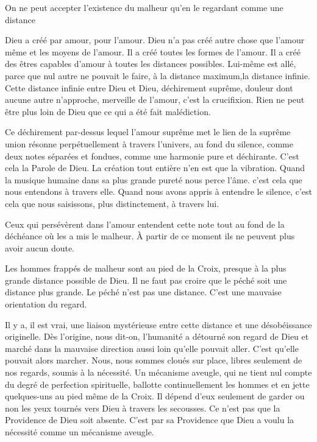 \documentclass[french,twoside]{book} %
\begin{document}
On ne peut accepter l'existence du malheur qu'en le regardant comme une distance\par
Dieu a créé par amour, pour l'amour. Dieu n'a pas créé autre chose que l'amour même et les moyens de l'amour. Il a créé toutes les formes de l'amour. Il a créé des êtres capables d'amour à toutes les distances possibles. Lui-même est allé, parce que nul autre ne pouvait le faire, à la distance maximum,la distance infinie. Cette distance infinie entre Dieu et Dieu, déchirement suprême, douleur dont aucune autre n'approche, merveille de l'amour, c'est la crucifixion. Rien ne peut être plus loin de Dieu que ce qui a été fait malédiction.\par
Ce déchirement par-dessus lequel l'amour suprême met le lien de la suprême union résonne perpétuellement à travers l'univers, au fond du silence, comme deux notes séparées et fondues, comme une harmonie pure et déchirante. C'est cela la Parole de Dieu. La création tout entière n'en est que la vibration. Quand la musique humaine dans sa plus grande pureté nous perce l'âme. c'est cela que nous entendons à travers elle. Quand nous avons appris à entendre le silence, c'est cela que nous saisissons, plus distinctement, à travers lui.\par
Ceux qui persévèrent dans l'amour entendent cette note tout au fond de la déchéance où les a mis le malheur. À partir de ce moment ils ne peuvent plus avoir aucun doute.\par
Les hommes frappés de malheur sont au pied de la Croix, presque à la plus grande distance possible de Dieu. Il ne faut pas croire que le péché soit une distance plus grande. Le péché n'est pas une distance. C'est une mauvaise orientation du regard.\par
Il y a, il est vrai, une liaison mystérieuse entre cette distance et une désobéissance originelle. Dès l'origine, nous dit-on, l'humanité a détourné son regard de Dieu et marché dans la mauvaise direction aussi loin qu'elle pouvait aller. C'est qu'elle pouvait alors marcher. Nous, nous sommes cloués sur place, libres seulement de nos regards, soumis à la nécessité. Un mécanisme aveugle, qui ne tient nul compte du degré de perfection spirituelle, ballotte continuellement les hommes et en jette quelques-uns au pied même de la Croix. Il dépend d'eux seulement de garder ou non les yeux tournés vers Dieu à travers les secousses. Ce n'est pas que la Providence de Dieu soit absente. C'est par sa Providence que Dieu a voulu la nécessité comme un mécanisme aveugle.\par
\end{document}
